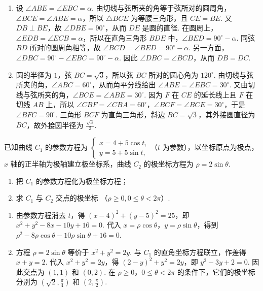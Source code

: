 \begin{solution}
\begin{enumerate}
\item 设 \(\angle ABE=\angle EBC=\alpha\). 由切线与弦所夹的角等于弦所对的圆周角，\(\angle BCE=\angle ABE=\alpha\)，所以 \(\triangle BCE\) 为等腰三角形，且 \(CE=BE\). 又 \(DB\perp BE\)，故 \(\angle DBE=90^\circ\)，从而 \(DE\) 是圆的直径. 在圆周上，\(\angle EDB=\angle ECB=\alpha\)，所以在直角三角形 \(BDE\) 中，\(\angle BED=90^\circ-\alpha\). 同弦 \(BD\) 所对的圆周角相等，故 \(\angle BCD=\angle BED=90^\circ-\alpha\). 另一方面，\(\angle DBC=90^\circ-\angle EBC=90^\circ-\alpha\). 因此 \(\angle DBC=\angle BCD\)，从而 \(DB=DC\).
\item 圆的半径为 \(1\)，弦 \(BC=\sqrt3\)，所以弦 \(BC\) 所对的圆心角为 \(120^\circ\). 由切线与弦所夹的角，\(\angle ABC=60^\circ\)，从而角平分线给出 \(\angle ABE=\angle EBC=30^\circ\). 又由切线与弦所夹的角，\(\angle BCE=\angle ABE=30^\circ\). 因为 \(F\) 在 \(CE\) 的延长线上且 \(F\) 在切线 \(AB\) 上，所以 \(\angle CBF=\angle CBA=60^\circ\)，\(\angle BCF=\angle BCE=30^\circ\)，于是 \(\angle BFC=90^\circ\). 三角形 \(BCF\) 为直角三角形，斜边 \(BC=\sqrt3\)，其外接圆直径为 \(BC\)，故外接圆半径为 \(\frac{\sqrt3}{2}\).
\end{enumerate}
\end{solution}

\begin{problem}
已知曲线 \(C_1\) 的参数方程为 \(\begin{cases}
x = 4 + 5\cos t,\\
y = 5 + 5\sin t,
\end{cases}\)（\(t\) 为参数），以坐标原点为极点，\(x\) 轴的正半轴为极轴建立极坐标系，曲线 \(C_2\) 的极坐标方程为 \(\rho = 2\sin\theta\).
\begin{enumerate}
\item 把 \(C_1\) 的参数方程化为极坐标方程；
\item 求 \(C_{1}\) 与 \(C_{2}\) 交点的极坐标 （\(\rho \geqslant 0, 0 \leqslant \theta < 2\pi\)）.
\end{enumerate}
\end{problem}

\begin{solution}
\begin{enumerate}
\item 由参数方程消去 \(t\)，得 \((x-4)^2+(y-5)^2=25\)，即 \(x^2+y^2-8x-10y+16=0\). 代入 \(x=\rho\cos\theta\)，\(y=\rho\sin\theta\)，得到
\(\rho^2-8\rho\cos\theta-10\rho\sin\theta+16=0\).
\item 方程 \(\rho=2\sin\theta\) 等价于 \(x^2+y^2=2y\). 与 \(C_1\) 的直角坐标方程联立，作差得 \(x+y=2\). 代入 \(x^2+y^2=2y\)，得
\(\displaystyle(2-y)^2+y^2=2y\)，即 \(y^2-3y+2=0\). 因此交点为 \((1,1)\) 和 \((0,2)\). 在 \(\rho\geqslant0\)，\(0\leqslant\theta<2\pi\) 的条件下，它们的极坐标分别为 \(\left(\sqrt2,\frac{\pi}{4}\right)\) 和 \(\left(2,\frac{\pi}{2}\right)\).
\end{enumerate}
\end{solution}

